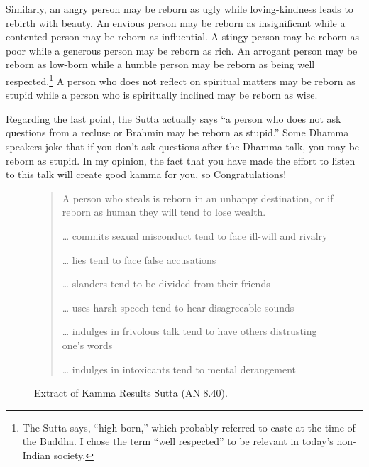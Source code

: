 Similarly, an angry person may be reborn as ugly while loving-kindness leads to rebirth with beauty. An envious person may be reborn as insignificant while a contented person may be reborn as influential. A stingy person may be reborn as poor while a generous person may be reborn as rich. An arrogant person may be reborn as low-born while a humble person may be reborn as being well respected.\footnote{The Sutta says, “high born,” which probably referred to caste at the time of the Buddha. I chose the term “well respected” to be relevant in today’s non-Indian society.} A person who does not reflect on spiritual matters may be reborn as stupid while a person who is spiritually inclined may be reborn as wise.

Regarding the last point, the Sutta actually says “a person who does not ask questions from a recluse or Brahmin may be reborn as stupid.” Some Dhamma speakers joke that if you don’t ask questions after the Dhamma talk, you may be reborn as stupid. In my opinion, the fact that you have made the effort to listen to this talk will create good kamma for you, so Congratulations! \smiley 

\begin{figure}[H]
\begin{quotation}
A person who steals is reborn in an unhappy destination, or if reborn as human they will tend to lose wealth.

… commits sexual misconduct \textrightarrow \hspace{1mm} tend to face ill-will and rivalry

… lies \textrightarrow \hspace{1mm} tend to face false accusations

… slanders \textrightarrow \hspace{1mm} tend to be divided from their friends

… uses harsh speech \textrightarrow \hspace{1mm} tend to hear disagreeable sounds

… indulges in frivolous talk \textrightarrow \hspace{1mm} tend to have others distrusting one’s words

… indulges in intoxicants \textrightarrow \hspace{1mm} tend to mental derangement
\end{quotation}
\caption{Extract of Kamma Results Sutta (AN 8.40).}
\label{fig:AN3}
\end{figure}


